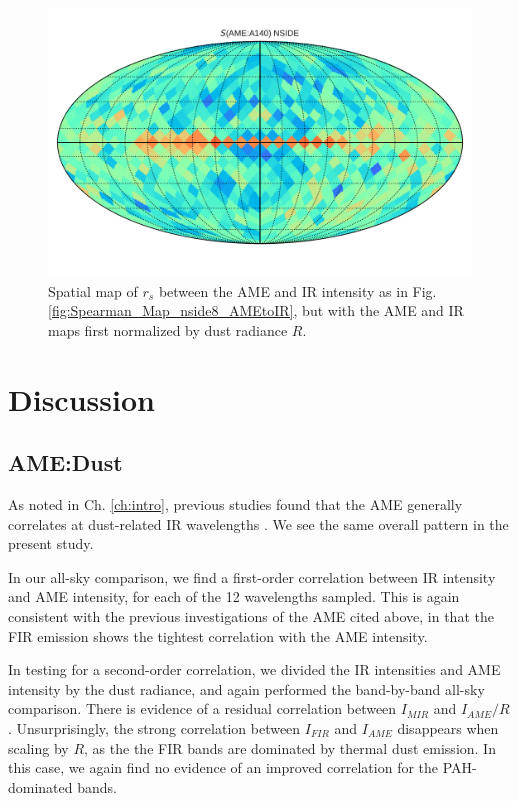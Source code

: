\begin{figure}
        \includegraphics[width=\textwidth/3]{../Plots/Allsky_Corr/RadNorm/Spearman_Map_nside8_AMEtoA140.pdf}
        \centering
        \caption{Spatial map of $r_{s}$ between the AME and IR intensity as in Fig. \ref{fig:Spearman_Map_nside8_AMEtoIR}, but with the AME and IR maps first normalized by dust radiance $R$.}
        \label{fig:Spearman_Map_nside8_AMEtoIR_radnorm}
     \end{figure}

    \section{Discussion}
      \subsection{AME:Dust}
        As noted in Ch. \hyperref[ch:intro]{\ref{ch:intro}}, previous studies found that the AME generally correlates at dust-related IR wavelengths \citep{ysard10b,planckXV, hensley16}. We see the same overall pattern in the present study.

         In our all-sky comparison, we find a first-order correlation between IR intensity and AME intensity, for each of the 12 wavelengths sampled. This is again consistent with the previous investigations of the AME cited above, in that the FIR emission shows the tightest correlation with the AME intensity.

         In testing for a second-order correlation, we divided the IR intensities and AME intensity by the dust radiance, and again performed the band-by-band all-sky comparison. There is evidence of a residual correlation between $I_{MIR}$ and $I_{AME}/R$. Unsurprisingly, the strong correlation between $I_{FIR}$ and $I_{AME}$ disappears when scaling by $R$, as the the FIR bands are dominated by thermal dust emission. In this case, we again find no evidence of an improved correlation for the PAH-dominated bands.


